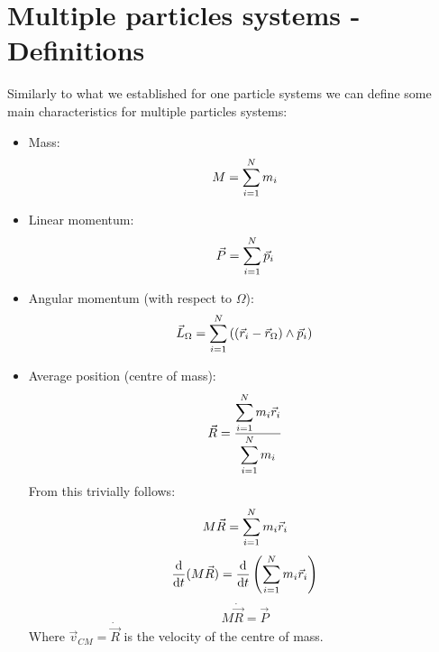 \section{Multiple particles systems - Definitions}
Similarly to what we established for one particle systems we can define some main characteristics for multiple particles systems:
\begin{itemize}
    \item Mass:\begin{equation}
        M = \displaystyle\sum_{i=1}^{N} m_i
    \end{equation}
    \item Linear momentum:\begin{equation}
        \vec{P} = \displaystyle\sum_{i=1}^{N} \vec{p}_i
    \end{equation}
    \item Angular momentum (with respect to $\Omega$):\begin{equation}
        \vec{L}_{\Omega} = \displaystyle\sum_{i=1}^{N} \left(\left(\vec{r}_i-\vec{r}_{\Omega}\right) \wedge \vec{p}_i\right)
    \end{equation}
    \item Average position (centre of mass): \begin{equation} \label{e:centre_of_mass}
        \vec{R} = \dfrac{\displaystyle\sum_{i=1}^{N}m_i\vec{r}_i}{\displaystyle\sum_{i=1}^{N}m_i}
    \end{equation}
    From this trivially follows:
    \begin{equation}
        M \vec{R} = \displaystyle\sum_{i=1}^{N}m_i\vec{r}_i
    \end{equation}
    \begin{equation}
        \dfrac{\mathrm{d}}{\mathrm{d}t}(M \vec{R}) = \dfrac{\mathrm{d}}{\mathrm{d}t}\left(\displaystyle\sum_{i=1}^{N}m_i\vec{r}_i\right)
    \end{equation}
    \begin{equation}
        M \dot{\vec{R}} = \vec{P}
    \end{equation}
    Where $\vec{v}_{CM} = \dot{\vec{R}}$ is the velocity of the centre of mass.
\end{itemize}
